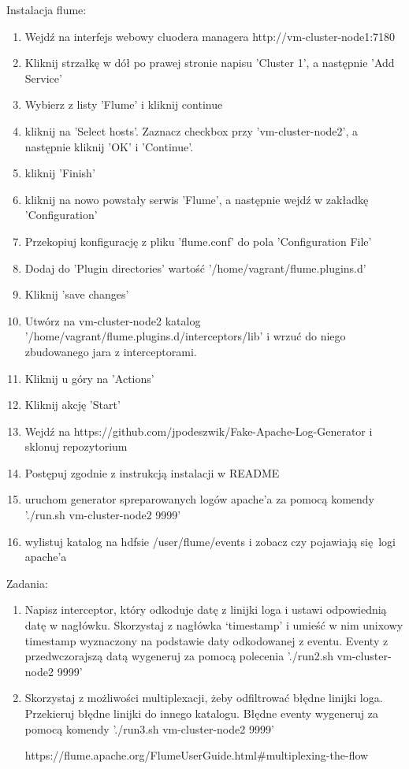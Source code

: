 \documentclass[11pt]{article}
\begin{document}
Instalacja flume:
\begin{enumerate}
\item Wejdź na interfejs webowy cluodera managera http://vm-cluster-node1:7180
\item Kliknij strzałkę w dół po prawej stronie napisu 'Cluster 1', a następnie 'Add Service'
\item Wybierz z listy 'Flume' i kliknij continue
\item kliknij na 'Select hosts'. Zaznacz checkbox przy 'vm-cluster-node2', a następnie kliknij 'OK' i 'Continue'.
\item kliknij 'Finish'
\item kliknij na nowo powstały serwis 'Flume', a następnie wejdź w zakładkę 'Configuration'
\item Przekopiuj konfigurację z pliku 'flume.conf' do pola 'Configuration File'
\item Dodaj do 'Plugin directories' wartość '/home/vagrant/flume.plugins.d'
\item Kliknij 'save changes'
\item Utwórz na vm-cluster-node2 katalog '/home/vagrant/flume.plugins.d/interceptors/lib' i wrzuć do niego zbudowanego jara z interceptorami.
\item Kliknij u góry na 'Actions'
\item Kliknij akcję 'Start'
\item Wejdź na https://github.com/jpodeszwik/Fake-Apache-Log-Generator i sklonuj repozytorium
\item Postępuj zgodnie z instrukcją instalacji w README
\item uruchom generator spreparowanych logów apache'a za pomocą komendy './run.sh vm-cluster-node2 9999'
\item wylistuj katalog na hdfsie /user/flume/events i zobacz czy pojawiają się logi apache'a
\end{enumerate}

\pagebreak

Zadania:
\begin{enumerate}
\item Napisz interceptor, który odkoduje datę z linijki loga i ustawi odpowiednią datę w nagłówku. Skorzystaj z nagłówka ‘timestamp’ i umieść w nim unixowy timestamp wyznaczony na podstawie daty odkodowanej z eventu. Eventy z przedwczorajszą datą wygeneruj za pomocą polecenia './run2.sh vm-cluster-node2 9999'
\item Skorzystaj z możliwości multiplexacji, żeby odfiltrować błędne linijki loga. Przekieruj błędne linijki do innego katalogu. Błędne eventy wygeneruj za pomocą komendy './run3.sh vm-cluster-node2 9999'

https://flume.apache.org/FlumeUserGuide.html\#multiplexing-the-flow
\end{enumerate}
\end{document}
